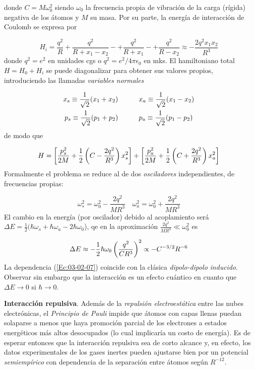 donde $C=M\omega_0^2$ siendo $\omega_0$ la frecuencia propia de vibración de la carga (rígida) negativa de los átomos y $M$ su masa. Por su parte, la energía de interacción de Coulomb se expresa por 

\begin{equation}
    H_i = \frac{q^2}{R} + \frac{q^2}{R+x_1-x_2} - + \frac{q^2}{R+x_1} - + \frac{q^2}{R-x_2} \approx - \frac{2q^2x_1x_2}{R^3}
\end{equation}
donde $q^2=e^2$ en unidades cgs o $q^2 = e^2 / 4\pi \epsilon_0$ en mks. El hamiltoniano total $H=H_0+H_i$ se puede diagonalizar para obtener sus valores propios, introduciendo las llamadas {\it variables normales}

\begin{align}
    x_s \equiv \frac{1}{\sqrt{2}} (x_1 + x_2)  \quad \quad \quad  & x_a \equiv \frac{1}{\sqrt{2}} (x_1-x_2) \\
    p_s \equiv \frac{1}{\sqrt{2}} (p_1 + p_2) \quad \quad \quad & p_a \equiv \frac{1}{\sqrt{2}} (p_1-p_2) 
\end{align}
de modo que 

\begin{equation}
    H = \left[ \frac{p_s^2}{2M}+ \frac{1}{2} \left( C- \frac{2q^2}{R^3} \right)x_s^2 \right] + \left[ \frac{p_a^2}{2M}+ \frac{1}{2} \left( C+ \frac{2q^2}{R^3} \right)x_a^2 \right] 
\end{equation}
Formalmente el problema se reduce al de dos \textit{osciladores} independientes, de frecuencias propias:

\begin{equation}
\omega_s^2 = \omega_0^2 - \frac{2q^2}{MR^3} \quad \omega_a^2 = \omega_0^2 + \frac{2q^2}{MR^3}
\end{equation}
El cambio en la energía (por oscilador) debido al acoplamiento será $\Delta E = \frac{1}{2} (\hbar \omega_s + \hbar \omega_a - 2 \hbar \omega_0$), qe en la aproximación  $ \frac{2q^2}{MR^3} \ll \omega_0^2$ es

\begin{equation}
\Delta E \approx - \frac{1}{2} \hbar \omega_0 \left( \frac{q^2}{CR^3} \right)^2 \propto -C^{-3/2}  R^{-6} \label{Ec:03-02-07}
\end{equation}
La dependencia (\ref{Ec:03-02-07}) coincide con la clásica \textit{dipolo-dipolo inducido}. Observar sin embargo que la interacción es un efecto cuántico en cuanto que $\Delta E \rightarrow 0$ si $\hbar \rightarrow 0$. 

\textbf{Interacción repulsiva}. Además de la \textit{repulsión electroestática} entre las nubes electrónicas, el \textit{Principio de Pauli} impide que átomos con capas llenas puedan solaparse a menos que haya promoción parcial de los electrones a estados energéticos más altos desocupados (lo cual implicaría un costo de energía). Es de esperar entonces que la interacción repulsiva sea de corto alcance y, en efecto, los datos experimentales de los gases inertes pueden ajustarse bien por un potencial \textit{semiempírico} con dependencia de la separación entre átomos según $R^{-12}$.

